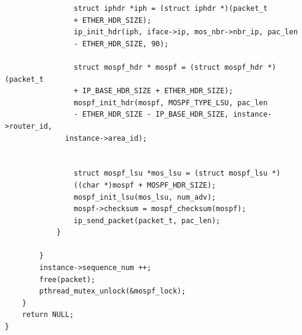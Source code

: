 \documentclass[UTF8,noindent]{ctexart}
\begin{document}
\begin{lstlisting}
                struct iphdr *iph = (struct iphdr *)(packet_t 
				+ ETHER_HDR_SIZE);
                ip_init_hdr(iph, iface->ip, mos_nbr->nbr_ip, pac_len 
				- ETHER_HDR_SIZE, 90);

                struct mospf_hdr * mospf = (struct mospf_hdr *)(packet_t 
				+ IP_BASE_HDR_SIZE + ETHER_HDR_SIZE);
                mospf_init_hdr(mospf, MOSPF_TYPE_LSU, pac_len 
				- ETHER_HDR_SIZE - IP_BASE_HDR_SIZE, instance->router_id,
			  instance->area_id);  
                
 
                struct mospf_lsu *mos_lsu = (struct mospf_lsu *)
				((char *)mospf + MOSPF_HDR_SIZE);
                mospf_init_lsu(mos_lsu, num_adv);
                mospf->checksum = mospf_checksum(mospf);
                ip_send_packet(packet_t, pac_len);
            }
        	
        }
        instance->sequence_num ++;
        free(packet);
    	pthread_mutex_unlock(&mospf_lock);
    }
	return NULL;
}
\end{lstlisting}
\end{document}
